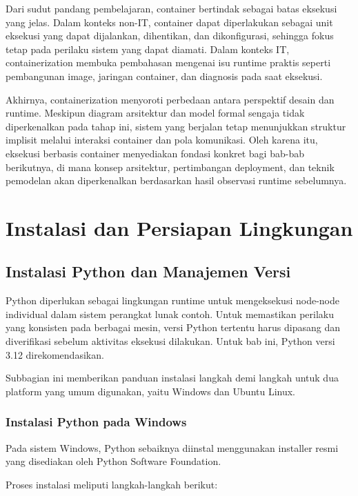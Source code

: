 Dari sudut pandang pembelajaran, container bertindak sebagai batas eksekusi yang
jelas. Dalam konteks non-IT, container dapat diperlakukan sebagai unit eksekusi
yang dapat dijalankan, dihentikan, dan dikonfigurasi, sehingga fokus tetap pada
perilaku sistem yang dapat diamati. Dalam konteks IT, containerization membuka
pembahasan mengenai isu runtime praktis seperti pembangunan image, jaringan
container, dan diagnosis pada saat eksekusi.

Akhirnya, containerization menyoroti perbedaan antara perspektif desain dan
runtime. Meskipun diagram arsitektur dan model formal sengaja tidak diperkenalkan
pada tahap ini, sistem yang berjalan tetap menunjukkan struktur implisit melalui
interaksi container dan pola komunikasi. Oleh karena itu, eksekusi berbasis
container menyediakan fondasi konkret bagi bab-bab berikutnya, di mana konsep
arsitektur, pertimbangan deployment, dan teknik pemodelan akan diperkenalkan
berdasarkan hasil observasi runtime sebelumnya.

\section{Instalasi dan Persiapan Lingkungan}
\label{sec:installation_and_environment_preparation}

\subsection{Instalasi Python dan Manajemen Versi}

Python diperlukan sebagai lingkungan runtime untuk mengeksekusi node-node
individual dalam sistem perangkat lunak contoh. Untuk memastikan perilaku yang
konsisten pada berbagai mesin, versi Python tertentu harus dipasang dan
diverifikasi sebelum aktivitas eksekusi dilakukan. Untuk bab ini, Python versi
3.12 direkomendasikan.

Subbagian ini memberikan panduan instalasi langkah demi langkah untuk dua
platform yang umum digunakan, yaitu Windows dan Ubuntu Linux.

\subsubsection{Instalasi Python pada Windows}

Pada sistem Windows, Python sebaiknya diinstal menggunakan installer resmi yang
disediakan oleh Python Software Foundation.

Proses instalasi meliputi langkah-langkah berikut:

